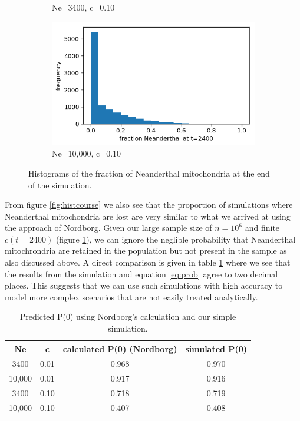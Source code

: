\documentclass{article}
\begin{document}
\begin{figure}[h]
\begin{subfigure}[t]{0.24\linewidth}
		\caption{Ne=3400, c=0.10}
	\end{subfigure}
	\hspace{0.0\linewidth}
	\begin{subfigure}[t]{0.24\linewidth}
		\centering
		\includegraphics[width = 1.0\linewidth, trim={0 0 0 0}, clip=true]{figures/Ne10000_c1_histfrac.png}
		\caption{Ne=10,000, c=0.10}
	\end{subfigure}
\caption{Histograms of the fraction of Neanderthal mitochondria at the end of the simulation.}
\label{fig:histend}
\end{figure}

From figure \ref{fig:histcourse} we also see that the proportion of simulations where Neanderthal mitochondria are lost are very similar to what we arrived at using the approach of Nordborg. Given our large sample size of $n=10^6$ and finite $c(t = 2400)$ (figure \ref{fig:histend}), we can ignore the neglible probability that Neanderthal mitochrondria are retained in the population but not present in the sample as also discussed above. A direct comparison is given in table \ref{tab:comparison} where we see that the results from the simulation and equation \ref{eq:prob} agree to two decimal places. This suggests that we can use such simulations with high accuracy to model more complex scenarios that are not easily treated analytically.

\begin{table}[h]
\centering
\begin{tabular}{ |c c c c|}
\hline
 Ne & c & calculated P(0) (Nordborg) & simulated P(0) \\
\hline
3400 & 0.01 & 0.968 & 0.970 \\
10,000 & 0.01 & 0.917 & 0.916 \\
3400 & 0.10 & 0.718 & 0.719 \\
10,000 & 0.10 & 0.407 & 0.408 \\
\hline
\end{tabular}
\caption{Predicted P(0) using Nordborg's calculation and our simple simulation.}
\label{tab:comparison}
\end{table}
\end{document}
